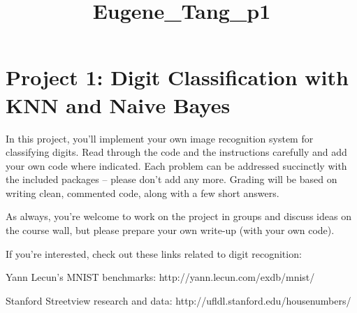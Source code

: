 \documentclass[11pt]{article}
\title{Eugene\_Tang\_p1}
\begin{document}
    
    
    \maketitle
    
    

    
    \hypertarget{project-1-digit-classification-with-knn-and-naive-bayes}{%
\section{Project 1: Digit Classification with KNN and Naive
Bayes}\label{project-1-digit-classification-with-knn-and-naive-bayes}}

    In this project, you'll implement your own image recognition system for
classifying digits. Read through the code and the instructions carefully
and add your own code where indicated. Each problem can be addressed
succinctly with the included packages -- please don't add any more.
Grading will be based on writing clean, commented code, along with a few
short answers.

As always, you're welcome to work on the project in groups and discuss
ideas on the course wall, but please prepare your own write-up (with
your own code).

If you're interested, check out these links related to digit
recognition:

Yann Lecun's MNIST benchmarks: http://yann.lecun.com/exdb/mnist/

Stanford Streetview research and data:
http://ufldl.stanford.edu/housenumbers/
\end{document}
